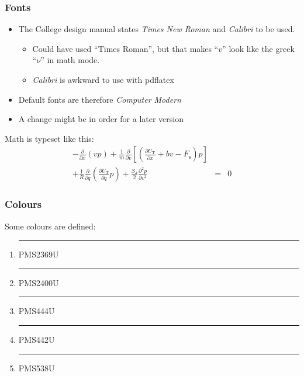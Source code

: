 \documentclass[aspectratio=169]{beamer}
\begin{document}
\begin{frame}
\frametitle{Fonts}
\begin{itemize}
\item The College design manual states \textit{Times New Roman} and \textit{Calibri} to be used. 
\begin{itemize}
\item Could have used ``Times Roman'', but that makes ``$v$'' look like the greek ``$\nu$'' in math mode. 
\item \textit{Calibri} is awkward to use with pdflatex 
\end{itemize}
\item Default fonts are therefore \textit{Computer Modern}
\item A change might be in order for a later version 
\end{itemize}
\vspace{5mm}

Math is typeset like this:
\begin{eqnarray}
-\frac{\partial}{\partial x}\left(vp\right)
+\frac{1}{m}\frac{\partial}{\partial v}\left[\left( \frac{\partial U_\mathrm{T}}{\partial x} +bv-F_\mathrm{s}\right)p\right] \nonumber \\
+\frac{1}{R}\frac{\partial}{\partial q}\left( \frac{\partial U_\mathrm{T}}{\partial q}p\right)
+ \frac{S_\mathrm{a}}{2}\frac{\partial^2p}{\partial v^2} & = & 0 \nonumber
\end{eqnarray}
\end{frame}


\begin{frame}
\frametitle{Colours}

Some colours are defined:\\

\begin{enumerate}
\item[]  {\color{PMS2369U}\rule{4em}{2ex}} PMS2369U
\item[]  {\color{PMS2400U}\rule{4em}{2ex}} PMS2400U
\item[]  {\color{PMS444U}\rule{4em}{2ex}}  PMS444U
\item[]  {\color{PMS442U}\rule{4em}{2ex}}  PMS442U
\item[]  {\color{PMS538U}\rule{4em}{2ex}}  PMS538U
\end{enumerate}

\end{frame}
\end{document}
